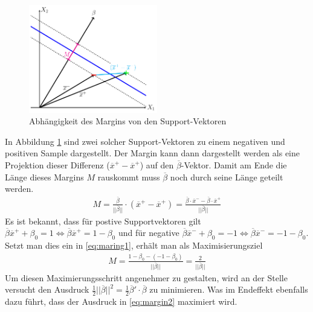 \documentclass[
]{article}
\begin{document}
\begin{figure}[h]
\centering
 \includegraphics[width=0.5\textwidth,trim=0.5cm 0.5cm 0.5cm 0.5cm]{Images/margin.pdf} 
        \caption{Abhängigkeit des Margins von den Support-Vektoren}
        \label{fig:SupVecs}
\end{figure}

In Abbildung \ref{fig:SupVecs} sind zwei solcher Support-Vektoren zu
einem negativen und positiven Sample dargestellt. Der Margin kann dann
dargestellt werden als eine Projektion dieser Differenz
(\(\overline{x}^+-\overline{x}^+\)) auf den \(\overline{\beta}\)-Vektor.
Damit am Ende die Länge dieses Margins \(M\) rauskommt muss
\(\overline{\beta}\) noch durch seine Länge geteilt werden.
\begin{align}
M=\frac{\overline{\beta}}{||\overline{\beta}||}\cdot \left(\overline{x}^+-\overline{x}^+\right)=\frac{\overline{\beta}\cdot\overline{x}^- -\overline{\beta}\cdot\overline{x}^+}{||\overline{\beta}||}\label{eq:maring1}
\end{align} Es ist bekannt, dass für postive Supportvektoren gilt
\(\overline\beta \overline{x}^+ +\beta_0 = 1 \Leftrightarrow \overline\beta \overline{x}^+=1-\beta_0\)
und für negative
\(\overline\beta \overline{x}^- +\beta_0 = -1 \Leftrightarrow \overline\beta \overline{x}^-=-1-\beta_0\).
Setzt man dies ein in \eqref{eq:maring1}, erhält man als
Maximisierungsziel \begin{align}
M=\frac{1-\beta_0-(-1-\beta_0)}{||\overline\beta||}=\frac{2}{||\overline\beta||}\label{eq:margin2}
\end{align} Um diesen Maximierungsschritt angenehmer zu gestalten, wird
an der Stelle versucht den Ausdruck
\(\frac{1}{2}||\overline \beta||^2=\frac{1}{2}\overline \beta '\cdot \overline \beta\)
zu minimieren. Was im Endeffekt ebenfalls dazu führt, dass der Ausdruck
in \eqref{eq:margin2} maximiert wird.
\end{document}
